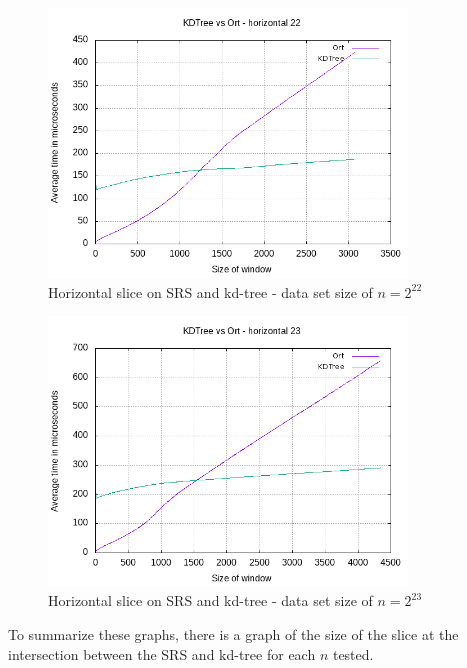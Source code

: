 {\begin{figure}[h]
    \centering
    \includegraphics[width = 0.85\textwidth]{pictures/analysis/hori_22.png}
    \caption{Horizontal slice on SRS and kd-tree - data set size of $n=2^{22}$}\label{fig:hori_22}
\end{figure}

\begin{figure}[h]
    \centering
    \includegraphics[width = 0.85\textwidth]{pictures/analysis/hori_23.png}
    \caption{Horizontal slice on SRS and kd-tree - data set size of $n=2^{23}$}\label{fig:hori_23}
\end{figure}


To summarize these graphs, there is a graph of the size of the slice at the intersection between the SRS and kd-tree for each $n$ tested.

}
